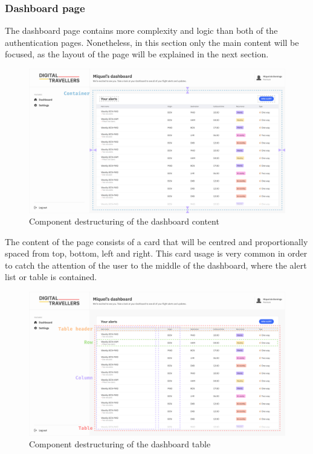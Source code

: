 \documentclass[./memory.tex]{subfiles}
\begin{document}
\subsubsection{Dashboard page}
The dashboard page contains more complexity and logic than both of the
authentication pages. Nonetheless, in this section only the main content will be
focused, as the layout of the page will be explained in the next section.
\begin{figure}[H]
	\centering
	\includegraphics[width=\textwidth]{./assets/designs/dashboard-web-container.png}
	\caption{Component destructuring of the dashboard content}
\end{figure}
The content of the page consists of a card that will be centred and
proportionally spaced from top, bottom, left and right. This card usage is very
common in order to catch the attention of the user to the middle of the
dashboard, where the alert list or table is contained.
\begin{figure}[H]
	\centering
	\includegraphics[width=\textwidth]{./assets/designs/dashboard-web-table.png}
	\caption{Component destructuring of the dashboard table}
\end{figure}
\end{document}
